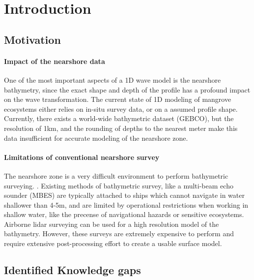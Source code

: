 \hypertarget{introduction}{%
  \chapter{Introduction}\label{introduction}}

\hypertarget{motivation}{%
  \section{Motivation}\label{motivation}}

\hypertarget{impact-of-the-nearshore-data}{%
  \subsubsection{Impact of the nearshore
    data}\label{impact-of-the-nearshore-data}}

One of the most important aspects of a 1D wave model is the nearshore
bathymetry, since the exact shape and depth of the profile has a
profound impact on the wave transformation. The current state of 1D
modeling of mangrove ecosystems either relies on in-situ survey data, or
on a assumed profile shape. Currently, there exists a world-wide
bathymetric dataset (GEBCO), but the resolution of 1km, and the rounding
of depths to the nearest meter make this data insufficient for accurate
modeling of the nearshore zone.

\hypertarget{limitations-of-conventional-nearshore-survey}{%
  \subsubsection{Limitations of conventional nearshore
    survey}\label{limitations-of-conventional-nearshore-survey}}

The nearshore zone is a very difficult environment to perform
bathymetric surveying. \cite{Parrish2019}. Existing methods of
bathymetric survey, like a multi-beam echo sounder (MBES) are typically
attached to ships which cannot navigate in water shallower than 4-5m,
and are limited by operational restrictions when working in shallow
water, like the precense of navigational hazards or sensitive
ecosystems. Airborne lidar surveying can be used for a high resolution
model of the bathymetry. However, these surveys are extremely expensive
to perform and require extensive post-processing effort to create a
usable surface model.

\hypertarget{identified-knowledge-gaps}{%
  \section{Identified Knowledge gaps}\label{identified-knowledge-gaps}}

